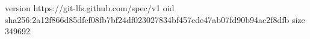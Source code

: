 version https://git-lfs.github.com/spec/v1
oid sha256:2a12f866d85dfef08fb7bf24df023027834bf457ede47ab07fd90b94ac2f8dfb
size 349692
